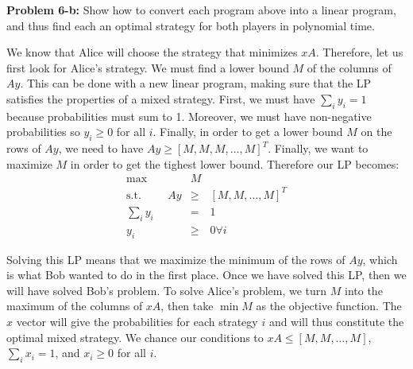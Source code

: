 \documentclass[psamsfonts]{amsart}
\newenvironment{sol}{\vspace{0.25cm}{\large \bfseries Solution:}}{\qedsymbol}
\newenvironment{prob}[1]{\begin{framed}{\large \bfseries Problem #1:}}{\end{framed}}
\begin{document}
\begin{prob}{6-b}
Show how to convert each program above into a linear program, and thus find each an optimal strategy for both players in polynomial time.
\end{prob}
\begin{sol}
We know that Alice will choose the strategy that minimizes $xA$. Therefore, let us first look for Alice's strategy. We must find a lower bound $M$ of the columns of $Ay$. This can be done with a new linear program, making sure that the LP satisfies the properties of a mixed strategy. First, we must have $\sum_{i} y_i = 1$ because probabilities must sum to 1. Moreover, we must have non-negative probabilities so $y_i \geq 0$ for all $i$. Finally, in order to get a lower bound $M$ on the rows of $Ay$, we need to have $Ay \geq [M, M, M, \ldots, M]^T$. Finally, we want to maximize $M$ in order to get the tighest lower bound. Therefore our LP becomes:
\begin{eqnarray}
\max &M& \\ 
\text{s.t.} \hspace{1cm} Ay &\geq& [M, M, \ldots, M]^T \\
\sum_i y_i &=& 1 \\
y_i &\geq& 0 \forall i
\end{eqnarray}

Solving this LP means that we maximize the minimum of the rows of $Ay$, which is what Bob wanted to do in the first place. Once we have solved this LP, then we will have solved Bob's problem. To solve Alice's problem, we turn $M$ into the maximum of the columns of $xA$, then take $\min M$ as the objective function. The $x$ vector will give the probabilities for each strategy $i$ and will thus constitute the optimal mixed strategy. We chance our conditions to $xA \leq [M, M, \ldots, M]$, $\sum_{i} x_i = 1$, and $x_i \geq 0$ for all $i$.  
\end{sol}
\end{document}
